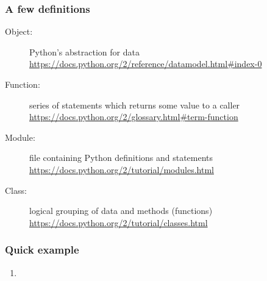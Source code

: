 \begin{frame}
\frametitle{A few definitions}

\begin{description}
\item[Object:] Python's abstraction for data\\
\url{https://docs.python.org/2/reference/datamodel.html#index-0}
\item[Function:] series of statements which returns some value to a caller\\
\url{https://docs.python.org/2/glossary.html#term-function}
\item[Module:] file containing Python definitions and statements\\
\url{https://docs.python.org/2/tutorial/modules.html}
\item[Class:] logical grouping of data and methods (functions)\\
\url{https://docs.python.org/2/tutorial/classes.html}
\end{description}

\end{frame}

\begin{frame}
\frametitle{Quick example}

\begin{enumerate}
\item 
\end{enumerate}

\end{frame}




